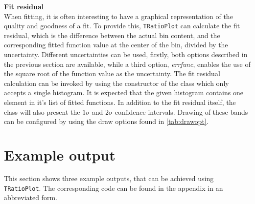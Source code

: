 \textbf{Fit residual}\\
When fitting, it is often interesting to have a graphical representation of the quality and goodness
of a fit. To provide this, \texttt{TRatioPlot} can calculate the fit residual, which is the difference
between the actual bin content, and the corresponding fitted function value at the center of the bin, divided
by the uncertainty. Different uncertainties can be used, firstly, both options described in the previous
section are available, while a third option, \emph{errfunc}, enables the use of the square root of the
function value as the uncertainty. The fit residual calculation can be invoked by using the constructor
of the class which only accepts a single histogram. It is expected that the given histogram contains
one element in it's list of fitted functions. In addition to the fit residual itself, the class 
will also present the $1\sigma$ and $2\sigma$ confidence intervals. Drawing of these bands can be 
configured by using the draw options found in \autoref{tab:drawopt}.


\section{Example output}
This section shows three example outputs, that can be achieved using \texttt{TRatioPlot}. The corresponding
code can be found in the appendix in an abbreviated form.

